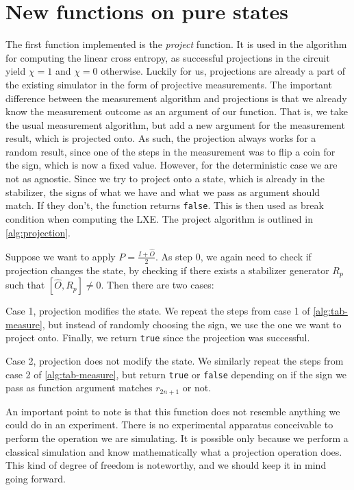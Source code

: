 \section{New functions on pure states}\label{sec:purestates}
The first function implemented is the \emph{project} function. It is used in
the algorithm for computing the linear cross entropy, as successful projections
in the circuit yield $\chi = 1$ and $\chi = 0$ otherwise. Luckily for us,
projections are already a part of the existing simulator in the form of
projective measurements. The important difference between the measurement
algorithm and projections is that we already know the measurement outcome as an
argument of our function. That is, we take the usual measurement algorithm, but
add a new argument for the measurement result, which is projected onto. As
such, the projection always works for a random result, since one of the steps
in the measurement was to flip a coin for the sign, which is now a fixed value.
However, for the deterministic case we are not as agnostic. Since we try to
project onto a state, which is already in the stabilizer, the signs of what we
have and what we pass as argument should match. If they don't, the function
returns \verb|false|. This is then used as break condition when computing the
LXE. The project algorithm is outlined in
\cref{alg:projection}.
\begin{alg}\label{alg:projection}
  Suppose we want to apply $P = \frac{I + \hat{O}}{2}$. As step 0, we again
  need to check if projection changes the state,
   by checking if there exists a stabilizer generator $R_p$
  such that $[\hat{O},R_p]\neq 0$. Then there are two cases:

  Case 1, projection modifies the state. We repeat the steps from case 1 of
  \cref{alg:tab-measure}, but instead of randomly choosing the sign, we use the
  one we want to project onto. Finally, we return \verb|true| since the
  projection was successful.

  Case 2, projection does not modify the state. We similarly repeat the steps
  from case 2 of \cref{alg:tab-measure}, but return \verb|true| or \verb|false|
  depending on if the sign we pass as function argument matches $r_{2n+1}$ or
  not.
\end{alg}
An important point to note is that this function does not resemble anything we
could do in an experiment. There is no experimental apparatus conceivable to
perform the operation we are simulating. It is possible only because we
perform a classical simulation and know mathematically what a projection
operation does. This kind of degree of freedom is noteworthy, and we should
keep it in mind going forward.

